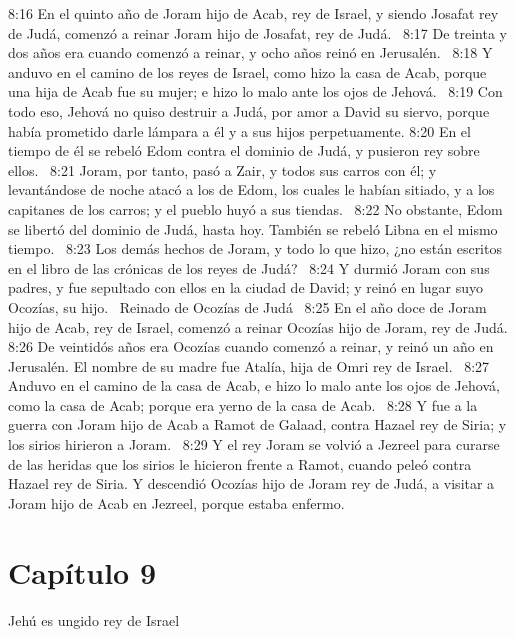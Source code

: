 8:16 En el quinto año de Joram hijo de Acab, rey de Israel, y siendo Josafat rey de Judá, comenzó a reinar Joram hijo de Josafat, rey de Judá.  
8:17 De treinta y dos años era cuando comenzó a reinar, y ocho años reinó en Jerusalén.  
8:18 Y anduvo en el camino de los reyes de Israel, como hizo la casa de Acab, porque una hija de Acab fue su mujer; e hizo lo malo ante los ojos de Jehová.  
8:19 Con todo eso, Jehová no quiso destruir a Judá, por amor a David su siervo, porque había prometido darle lámpara a él y a sus hijos perpetuamente. 
8:20 En el tiempo de él se rebeló Edom contra el dominio de Judá, y pusieron rey sobre ellos.  
8:21 Joram, por tanto, pasó a Zair, y todos sus carros con él; y levantándose de noche atacó a los de Edom, los cuales le habían sitiado, y a los capitanes de los carros; y el pueblo huyó a sus tiendas.  
8:22 No obstante, Edom se libertó del dominio de Judá, hasta hoy. También se rebeló Libna en el mismo tiempo.  
8:23 Los demás hechos de Joram, y todo lo que hizo, ¿no están escritos en el libro de las crónicas de los reyes de Judá?  
8:24 Y durmió Joram con sus padres, y fue sepultado con ellos en la ciudad de David; y reinó en lugar suyo Ocozías, su hijo.  
Reinado de Ocozías de Judá   
8:25 En el año doce de Joram hijo de Acab, rey de Israel, comenzó a reinar Ocozías hijo de Joram, rey de Judá. 
8:26 De veintidós años era Ocozías cuando comenzó a reinar, y reinó un año en Jerusalén. El nombre de su madre fue Atalía, hija de Omri rey de Israel.  
8:27 Anduvo en el camino de la casa de Acab, e hizo lo malo ante los ojos de Jehová, como la casa de Acab; porque era yerno de la casa de Acab.  
8:28 Y fue a la guerra con Joram hijo de Acab a Ramot de Galaad, contra Hazael rey de Siria; y los sirios hirieron a Joram.  
8:29 Y el rey Joram se volvió a Jezreel para curarse de las heridas que los sirios le hicieron frente a Ramot, cuando peleó contra Hazael rey de Siria. Y descendió Ocozías hijo de Joram rey de Judá, a visitar a Joram hijo de Acab en Jezreel, porque estaba enfermo.  
\section*{Capítulo 9 }
Jehú es ungido rey de Israel  

